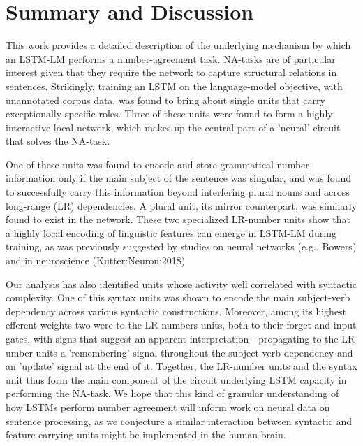 
\section{Summary and Discussion}
This work provides a detailed description of the underlying mechanism by which an LSTM-LM performs a number-agreement task. NA-tasks are of particular interest given that they require the network to capture structural relations in sentences. Strikingly, training an LSTM on the language-model objective, with unannotated corpus data, was found to bring about single units that carry exceptionally specific roles. Three of these units were found to form a highly interactive local network, which makes up the central part of a 'neural' circuit that solves the NA-task.

One of these units was found to encode and store grammatical-number information only if the main subject of the sentence was singular, and was found to successfully carry this information beyond interfering plural nouns and across long-range (LR) dependencies. A plural unit, its mirror counterpart, was similarly found to exist in the network. These two specialized LR-number units show that a highly local encoding of linguistic features can emerge in LSTM-LM during training, as was previously suggested by studies on neural networks (e.g., Bowers) and in neuroscience (Kutter:Neuron:2018)

Our analysis has also identified units whose activity well correlated with syntactic complexity. One of this syntax units was shown to encode the main subject-verb dependency across various syntactic constructions. Moreover, among its highest efferent weights two were to the LR numbers-units, both to their forget and input gates, with signs that suggest an apparent interpretation - propagating to the LR umber-units a 'remembering' signal throughout the subject-verb dependency and an 'update' signal at the end of it. Together, the LR-number units and the syntax unit thus form the main component of the circuit underlying LSTM capacity in performing the NA-task. We hope that this kind of granular understanding of how LSTMs perform number agreement will inform work on neural data on sentence processing, as we conjecture a similar interaction between syntactic and feature-carrying units might be implemented in the human brain.

